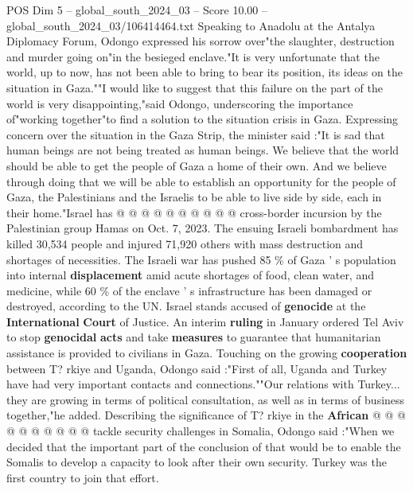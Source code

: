 \begin{textsample}{POS Dim 5 – global\_south\_2024\_03 – Score 10.00 – global\_south\_2024\_03/106414464.txt}  \label{ex:f5_pos_250}
Speaking to Anadolu at the Antalya Diplomacy Forum, Odongo expressed his sorrow over"the slaughter, destruction and murder going on"in the besieged enclave."It is very unfortunate that the world, up to now, has not been able to bring to bear its position, its ideas on the situation in Gaza.""I would like to suggest that this failure on the part of the world is very disappointing,"said Odongo, underscoring the importance of"working together"to find a solution to the situation crisis in Gaza.
Expressing concern over the situation in the Gaza Strip, the minister said :"It is sad that human beings are not being treated as human beings.
We believe that the world should be able to get the people of Gaza a home of their own.
And we believe through doing that we will be able to establish an opportunity for the people of Gaza, the Palestinians and the Israelis to be able to live side by side, each in their home."Israel has @ @ @ @ @ @ @ @ @ @ cross-border incursion by the Palestinian group Hamas on Oct. 7, 2023.
The ensuing Israeli bombardment has killed 30,534 people and injured 71,920 others with mass destruction and shortages of necessities.
The Israeli war has pushed 85 \% of Gaza ' s population into internal \textbf{displacement} amid acute shortages of food, clean water, and medicine, while 60 \% of the enclave ' s infrastructure has been damaged or destroyed, according to the UN.
Israel stands accused of \textbf{genocide} at the \textbf{International} \textbf{Court} of Justice.
An interim \textbf{ruling} in January ordered Tel Aviv to stop \textbf{genocidal} \textbf{acts} and take \textbf{measures} to guarantee that humanitarian assistance is provided to civilians in Gaza.
Touching on the growing \textbf{cooperation} between T? rkiye and Uganda, Odongo said :"First of all, Uganda and Turkey have had very important contacts and connections.""Our relations with Turkey... they are growing in terms of political consultation, as well as in terms of business together,"he added.
Describing the significance of T? rkiye in the \textbf{African} @ @ @ @ @ @ @ @ @ @ tackle security challenges in Somalia, Odongo said :"When we decided that the important part of the conclusion of that would be to enable the Somalis to develop a capacity to look after their own security.
Turkey was the first country to join that effort.

\end{textsample}
